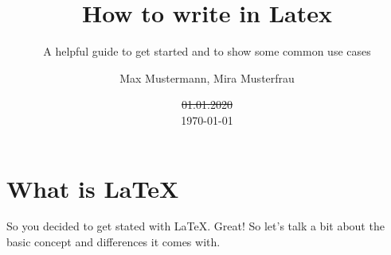 \documentclass[
        faculty=1,
        paper=a4,
        fontsize=11pt,
        fontfamily=sans-serif,
        language=english,
        parskip=half+,
        linespacing=single,
        twoside=true,
        todos=off,
        draft=false,
    ]{HsH-report}
\author{
    Max Mustermann,
    Mira Musterfrau
} %
\title{How to write in Latex}
\subtitle{A helpful guide to get started and to show some common use cases}
\date{\st{01.01.2020}\\\today}
\begin{document}
\frontmatter

\maketitle[c]

\declarationofauthorship

\begin{abstract}
    \lipsum[5-6]
\end{abstract}

\tableofcontents

\mainmatter


\chapter{What is LaTeX} \label{chap: latex}
    So you decided to get stated with LaTeX. Great! So let's talk a bit about the basic concept and differences it comes with.
\end{document}
